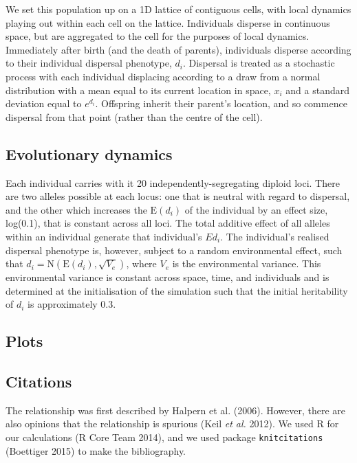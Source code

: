 \documentclass[]{article}
\begin{document}
We set this population up on a 1D lattice of contiguous cells, with
local dynamics playing out within each cell on the lattice. Individuals
disperse in continuous space, but are aggregated to the cell for the
purposes of local dynamics. Immediately after birth (and the death of
parents), individuals disperse according to their individual dispersal
phenotype, \(d_i\). Dispersal is treated as a stochastic process with
each individual displacing according to a draw from a normal
distribution with a mean equal to its current location in space, \(x_i\)
and a standard deviation equal to \(e^{d_i}\). Offspring inherit their
parent's location, and so commence dispersal from that point (rather
than the centre of the cell).

\subsection{Evolutionary dynamics}\label{evolutionary-dynamics}

Each individual carries with it 20 independently-segregating diploid
loci. There are two alleles possible at each locus: one that is neutral
with regard to dispersal, and the other which increases the
\(\text{E}(d_i)\) of the individual by an effect size, log(0.1), that is
constant across all loci. The total additive effect of all alleles
within an individual generate that individual's \(E{d_i}\). The
individual's realised dispersal phenotype is, however, subject to a
random environmental effect, such that
\(d_i=\text{N}(\text{E}(d_i), \sqrt{V_e})\), where \(V_e\) is the
environmental variance. This environmental variance is constant across
space, time, and individuals and is determined at the initialisation of
the simulation such that the initial heritability of \(d_i\) is
approximately 0.3.

\subsection{Plots}\label{plots}

\subsection{Citations}\label{citations}

The relationship was first described by Halpern et al. (2006). However,
there are also opinions that the relationship is spurious (Keil \emph{et
al.} 2012). We used R for our calculations (R Core Team 2014), and we
used package \texttt{knitcitations} (Boettiger 2015) to make the
bibliography.
\end{document}
